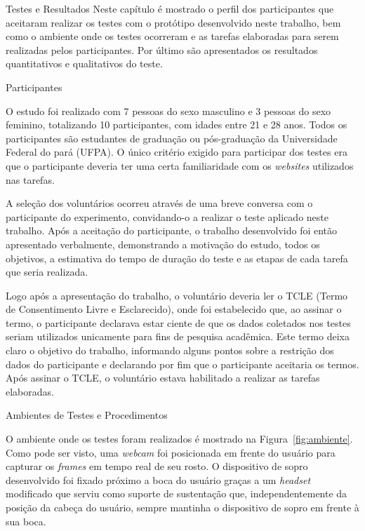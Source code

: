 \begin{chapter}{Testes e Resultados}
\vspace{-0.5cm}
Neste capítulo é mostrado o perfil dos participantes que aceitaram realizar os
testes com o protótipo desenvolvido neste trabalho, bem como o ambiente onde os
testes ocorreram e as tarefas elaboradas para serem realizadas pelos
participantes.  Por último são apresentados os resultados quantitativos e
qualitativos do teste.  %

\vspace{-0.5cm}
\begin{section}{Participantes}

O estudo foi realizado com 7 pessoas do sexo masculino e 3 pessoas do sexo
feminino, totalizando 10 participantes, com idades entre 21 e 28 anos.
Todos os participantes são estudantes de graduação ou pós-graduação da
Universidade Federal do pará (UFPA). O único critério exigido para participar
dos testes era que o participante deveria ter uma certa familiaridade com os
\textit{websites} utilizados nas tarefas.  

A seleção dos voluntários ocorreu através de uma breve conversa com o
participante do experimento, convidando-o a realizar o teste aplicado neste
trabalho. Após a aceitação do participante, o trabalho desenvolvido foi então
apresentado verbalmente, demonstrando a motivação do estudo, todos os objetivos,
a estimativa do tempo de duração do teste e as etapas de cada tarefa que
seria realizada. 

Logo após a apresentação do trabalho, o voluntário deveria ler o TCLE (Termo de
Consentimento Livre e Esclarecido), onde foi estabelecido que, ao assinar o
termo, o participante declarava estar ciente de que os dados coletados nos
testes seriam utilizados unicamente para fins de pesquisa acadêmica. Este termo
deixa claro o objetivo do trabalho, informando alguns pontos sobre a restrição
dos dados do participante e declarando por fim que o participante aceitaria os
termos. Após assinar o TCLE, o voluntário estava habilitado a realizar as
tarefas elaboradas. 

\end{section}

\begin{section}{Ambientes de Testes e Procedimentos}

O ambiente onde os testes foram realizados é mostrado na
Figura~\ref{fig:ambiente}.  Como pode ser visto, uma \textit{webcam} foi
posicionada em frente do usuário para capturar os \textit{frames} em tempo real
de seu rosto. O dispositivo de sopro desenvolvido foi fixado próximo a boca do
usuário graças a um \textit{headset} modificado que serviu como suporte de
sustentação que, independentemente da posição da cabeça do usuário, sempre
mantinha o dispositivo de sopro em frente à sua boca.


\end{section}
\end{chapter}

